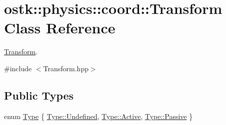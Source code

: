 \hypertarget{classostk_1_1physics_1_1coord_1_1_transform}{}\section{ostk\+:\+:physics\+:\+:coord\+:\+:Transform Class Reference}
\label{classostk_1_1physics_1_1coord_1_1_transform}


\hyperlink{classostk_1_1physics_1_1coord_1_1_transform}{Transform}.  




{\ttfamily \#include $<$Transform.\+hpp$>$}

\subsection*{Public Types}
\begin{DoxyCompactItemize}
\item 
enum \hyperlink{classostk_1_1physics_1_1coord_1_1_transform_a4325aff71186125b3ca8604247f55215}{Type} \{ \hyperlink{classostk_1_1physics_1_1coord_1_1_transform_a4325aff71186125b3ca8604247f55215aec0fc0100c4fc1ce4eea230c3dc10360}{Type\+::\+Undefined}, 
\hyperlink{classostk_1_1physics_1_1coord_1_1_transform_a4325aff71186125b3ca8604247f55215a4d3d769b812b6faa6b76e1a8abaece2d}{Type\+::\+Active}, 
\hyperlink{classostk_1_1physics_1_1coord_1_1_transform_a4325aff71186125b3ca8604247f55215af80bc338b6146b566004a046f8137c85}{Type\+::\+Passive}
 \}
\end{DoxyCompactItemize}
